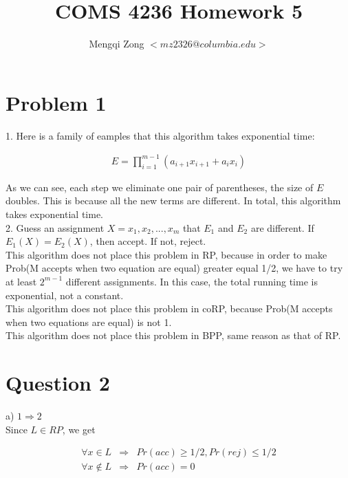 \documentclass[12pt]{article}
\title{COMS 4236 Homework 5}
\author{Mengqi Zong $<mz2326@columbia.edu>$}
\begin{document}
\maketitle

\setlength{\parindent}{0in}

\section*{Problem 1}

1. Here is a family of eamples that this algorithm takes exponential
time:

\begin{eqnarray*}
E = \prod^{m-1}_{i = 1} (a_{i+1}x_{i+1} + a_ix_i)
\end{eqnarray*}

As we can see, each step we eliminate one pair of parentheses, the
size of $E$ doubles. This is because all the new terms are
different. In total, this algorithm takes exponential time. \\

2. Guess an assignment $X = x_1,x_2,...,x_m$ that $E_1$ and $E_2$ are
different. If $E_1(X) = E_2(X)$, then accept. If not, reject. \\

This algorithm does not place this problem in RP, because in order to
make Prob(M accepts when two equation are equal) greater equal 1/2,
we have to try at least $2^{m-1}$ different assignments. In this case,
the total running time is exponential, not a constant. \\

This algorithm does not place this problem in coRP, because  Prob(M
accepts when two equations are equal) is not 1. \\

This algorithm does not place this problem in BPP, same reason as that
of RP.

\section*{Question 2}

a) $1 \Rightarrow 2$ \\

Since $L \in RP$, we get

\begin{eqnarray*}
\forall x \in L &\Rightarrow& Pr(acc) \ge 1/2, Pr(rej) \le 1/2 \\
\forall x \notin L &\Rightarrow& Pr(acc) = 0
\end{eqnarray*}
\end{document}
